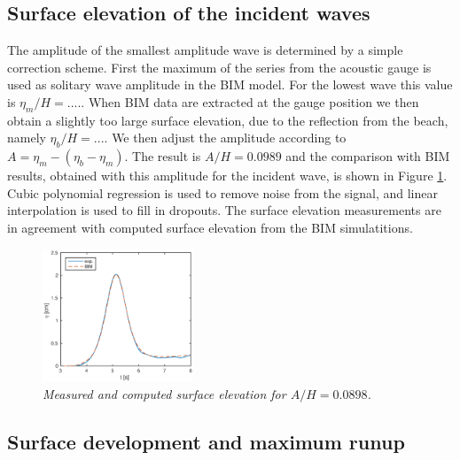 \documentclass[a4paper, 11pt, english, twoside, openright]{article}
\begin{document}
\subsection{Surface elevation of the incident waves}
\label{surf_elev}
The amplitude of the smallest amplitude wave is determined by
a simple correction scheme. First the maximum of the series from the 
acoustic gauge is used as solitary wave amplitude in the BIM model.
For the lowest wave this value is $\eta_m/H=....$.
When BIM data are extracted at the gauge position we then obtain 
a slightly too large surface elevation, due to the reflection from 
the beach, namely $\eta_b/H=...$. We then adjust the amplitude 
according to $A=\eta_m-(\eta_b-\eta_m)$. 
The result is $A/H=0.0989$ and the comparison with BIM results, obtained with this amplitude for the incident wave,
 is shown in Figure \ref{fig:surf_ele1}. Cubic polynomial regression is used to remove noise from the signal, and linear interpolation is used to fill 
in  dropouts. The surface elevation measurements are in agreement with computed surface elevation from  the BIM simulatitions.


\begin{figure}
\centering
\includegraphics[width=0.4\textwidth]{./Figures/BIM/BIM_probes.eps}
\caption{\textit{Measured and computed surface elevation for $A/H=0.0898$.}}
\label{fig:surf_ele1}
\end{figure}


\subsection{Surface development and maximum runup}
\label{max_run}
\end{document}
